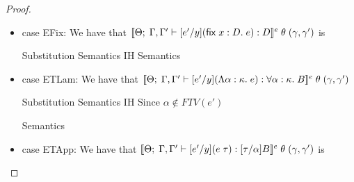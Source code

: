 \begin{proof}
\begin{itemize}
\item case EFix: We have that $[\![{{\Theta};\;{\Gamma, \Gamma'} \vdash {[e'/y](\mbox{\textsf{{fix}}}\;{x:D}.\;{e})} : {D}}]\!]^e\;\theta\;(\gamma,\gamma')$ is

  \begin{eqnproof}
          {Substitution}
          {Semantics}
          {IH }
           {Semantics}
  \end{eqnproof}

\item case ETLam: We have that $[\![{{\Theta};\;{\Gamma,\Gamma'} \vdash {[e'/y](\Lambda \alpha:\kappa.\;e)} : {\forall \alpha:\kappa.\;B}}]\!]^e\;\theta\;(\gamma,\gamma')$ 

  \begin{eqnproof}
          {Substitution}
          {Semantics}
          {IH}
          {Since $\alpha \not\in FTV(e')$}

          {Semantics}                 
  \end{eqnproof}

\item case ETApp: We have that $[\![{{\Theta};\;{\Gamma,\Gamma'} \vdash {[e'/y](e\;\tau)} : {[\tau/\alpha]B}}]\!]^e\;\theta\;(\gamma, \gamma')$ is 


\end{itemize}
\end{proof}
